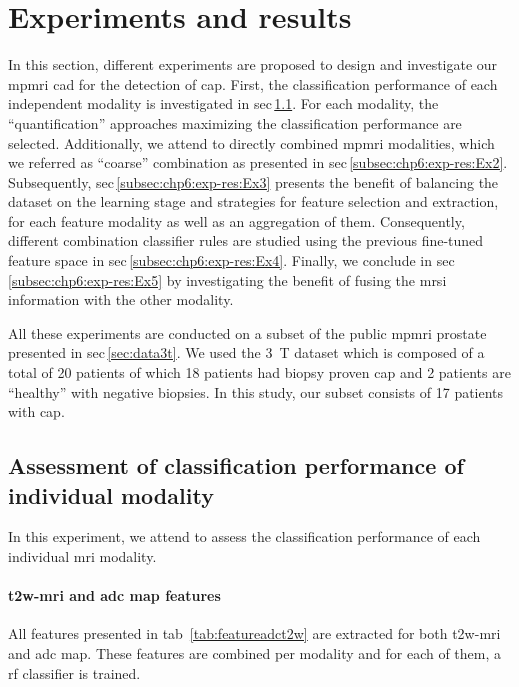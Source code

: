 \section{Experiments and results}\label{sec:chp6:exp-res}

In this section, different experiments are proposed to design and investigate our \ac{mpmri} \ac{cad} for the detection of \ac{cap}.
First, the classification performance of each independent modality is investigated in \acs{sec}\,\ref{subec:chp6:exp-res:Ex1}.
For each modality, the ``quantification'' approaches maximizing the classification performance are selected.
Additionally, we attend to directly combined \ac{mpmri} modalities, which we referred as ``coarse'' combination as presented in \acs*{sec}\,\ref{subsec:chp6:exp-res:Ex2}.
Subsequently, \acs{sec}\,\ref{subsec:chp6:exp-res:Ex3} presents the benefit of balancing the dataset on the learning stage and strategies for feature selection and extraction, for each feature modality as well as an aggregation of them.
Consequently, different combination classifier rules are studied using the previous fine-tuned feature space in \acs{sec}\,\ref{subsec:chp6:exp-res:Ex4}.
Finally, we conclude in \acs{sec}\,\ref{subsec:chp6:exp-res:Ex5} by investigating the benefit of fusing the \ac{mrsi} information with the other modality.

All these experiments are conducted on a subset of the public \ac{mpmri} prostate presented in \acs{sec}\,\ref{sec:data3t}.
We used the \SI{3}{\tesla} dataset which is composed of a total of 20 patients of which 18 patients had biopsy proven \ac{cap} and 2 patients are ``healthy'' with negative biopsies. 
In this study, our subset consists of 17 patients with \ac{cap}.

\subsection{Assessment of classification performance of individual modality}\label{subec:chp6:exp-res:Ex1}

In this experiment, we attend to assess the classification performance of each individual \ac{mri} modality.

\paragraph{\ac{t2w}-\ac{mri} and \ac{adc} map features} All features presented in \acs{tab}~\ref{tab:featureadct2w} are extracted for both \ac{t2w}-\ac{mri} and \ac{adc} map.
These features are combined per modality and for each of them, a \ac{rf} classifier is trained.

